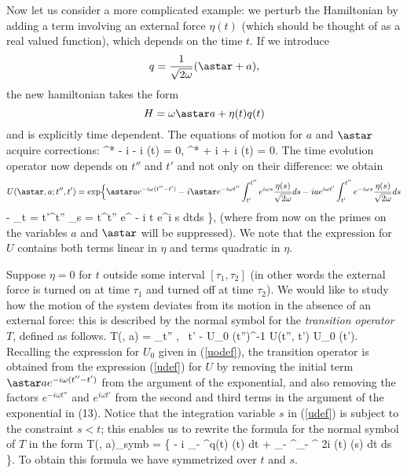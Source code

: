 Now let us consider a more complicated example: we perturb the 
Hamiltonian by adding a term involving an  external force $\eta (t)$ (which
should be thought of as a real valued function),  which depends on the 
time $t$. If we introduce 
$$q = \frac{1}{\sqrt{2 \omega} } (\astar + a), $$
the new hamiltonian takes the form 
$$H = \omega \astar a + \eta(t) q(t) $$
and is explicitly time dependent.
The equations of motion for $a$ and $\astar$ acquire
corrections:
\beq {}^* - i \omega \astar - i \eta(t) = 0, \eeq
\beq {}^* + i \omega \astar + i \eta(t) = 0. \eeq
The time evolution operator now depends on $t''$ and $t'$ and not only 
on their difference: we obtain
$$ U(\astar, a; t'', t') = 
\exp  \Bigl \{  \astar a e^{ - i \omega (t'' - t') } 
- i \astar e^{ - i \omega t''} \int_{t'}^{t''} 
e^{ i \omega s} \frac{\eta(s)}{\sqrt{2\omega} } ds 
- i a e^{  i \omega t'} \int_{t'}^{t''} 
e^{- i \omega s} \frac{\eta(s)}{\sqrt{2\omega} } ds  $$
\beq \label{udef} - \int_{t = t'}^{t''} 
\int_{s = t}^{t''} e^{ - i \omega t } e^{i \omega s }
   dtds \Bigr \}, \eeq
(where from now on the primes on the 
variables $a$ and $\astar$ will be suppressed).
We note that the expression for $U$ contains both terms linear
in $\eta$ and terms quadratic in $\eta$. 

Suppose $\eta = 0 $ for $t$ outside some interval 
$[\tau_1, \tau_2]$ 
(in other words the external force is turned on at time $\tau_1$ 
and turned off at time $\tau_2$). We would like to study how the motion
of the system deviates from its motion  in the absence  of an external force:
this is described by the normal 
symbol for the {\em transition operator} $T$, defined as follows.
\beq 
T(\astar, a) = \lim_{t'' \to \infty, ~t' \to - \infty}
U_0 (t'')^{-1} U(t'', t') U_0 (t'). \eeq
Recalling the expression for $U_0$ given in  (\ref{uodef}), the
transition operator is obtained from the expression (\ref{udef}) for 
$U$ by removing the initial term 
$\astar a e^{ -i \omega (t'' - t')} $ from the argument of the exponential,
and also removing the factors $e^{-i \omega t''} $ and 
$e^{i \omega t'}$ from the second and third terms in the argument of the 
exponential in (13).
Notice that the integration variable $s$ in (\ref{udef}) is subject to 
the constraint  $s < t$; this enables us to rewrite the formula for
the normal symbol of  $T$ 
in the form 
\beq \label{tdef}
T(\astar, a)_{\rm symb} = 
\exp \left \{ - i \int_{- \infty}^\infty q(t) \eta(t) dt 
+  \int_{- \infty}^\infty \int_{- \infty}^\infty 
{} {2i\omega} \eta(t) \eta(s) dt ds \right \}. \eeq
To obtain this formula we have symmetrized over $t$ and $s$. 

